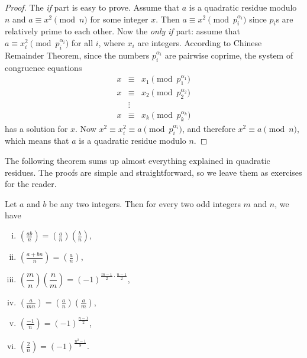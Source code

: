 \documentclass[12pt]{subfile}
\begin{document}
	\begin{proof}
		The \textit{if} part is easy to prove. Assume that $a$ is a quadratic residue modulo $n$ and $a \equiv x^2 \pmod n$ for some integer $x$. Then $a \equiv x^2 \pmod{p_i^{\alpha_i}}$ since $p_i$s are relatively prime to each other. Now the \textit{only if} part: assume that $a \equiv x_i^2 \pmod{p_i^{\alpha_i}}$ for all $i$, where $x_i$ are integers. According to Chinese Remainder Theorem, since the numbers ${p_i^{\alpha_i}}$ are pairwise coprime, the system of congruence equations
		\begin{eqnarray*}
		x & \equiv& x_1\pmod{p_1^{\alpha_1}}\\
		x & \equiv& x_2\pmod{p_2^{\alpha_2}}\\
		& \vdots&\\
		x & \equiv& x_k\pmod{p_k^{\alpha_k}}
		\end{eqnarray*}
		has a solution for $x$. Now $x^2 \equiv x_i^2 \equiv a \pmod{p_i^{\alpha_i}}$, and therefore $x^2 \equiv a \pmod n$, which means that $a$ is a quadratic residue modulo $n$.
	\end{proof}
	
	The following theorem sums up almost everything explained in quadratic residues. The proofs are simple and straightforward, so we leave them as exercises for the reader.
		\begin{theorem}
			Let $a$ and $b$ be any two integers. Then for every two odd integers $m$ and $n$, we have
			\begin{enumerate}[i.]
				\item $\displaystyle \left(\frac{ab}{n}\right) = \left(\frac{a}{n}\right) \left(\frac{b}{n}\right)$,
				\item $\displaystyle \left(\frac{a+bn}{n}\right) = \left(\frac{a}{n}\right)$,
				\item $\displaystyle \left(\dfrac{m}{n}\right)\left(\dfrac{n}{m}\right)=(-1)^{\frac{m-1}{2}\cdot \frac{n-1}{2}}$,
				\item $\displaystyle \left(\frac{a}{mn}\right) = \left(\frac{a}{n}\right) \left(\frac{a}{m}\right)$,
				\item $\displaystyle \left(\frac{-1}{n}\right) = (-1)^{\frac{n-1}{2}}$,
				\item $\displaystyle \left(\frac{2}{n}\right) = (-1)^{\frac{n^2-1}{8}}$.
			\end{enumerate}
		\end{theorem}
	
\end{document}
